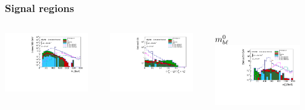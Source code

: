 \documentclass[10pt, svgnames]{beamer}
\begin{document}
\begin{frame}[t]
  \frametitle{Signal regions}
  \begin{columns}[t]
    \begin{block}{\HT}
      \includegraphics[width=0.9\textwidth]{figures/ht_sr_400_minus_ht.pdf}
    \end{block}
    \begin{block}{\MBLASYM}
      \includegraphics[width=0.9\textwidth]{figures/mbl_asym_sr_400_minus_mbl_asym.pdf}
    \end{block}
    \begin{block}{$\MBL^0$}
      \includegraphics[width=0.9\textwidth]{figures/mbl_0_sr_minus_mbl.pdf}

\end{block}
\end{columns}
\end{frame}
\end{document}
